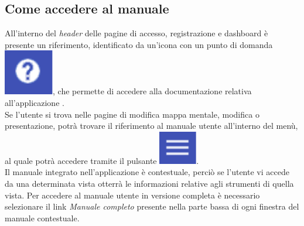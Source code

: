 \subsection{Come accedere al manuale}
All'interno del \textit{header} delle pagine di accesso, registrazione e dashboard è presente un riferimento, identificato da un'icona con un punto di domanda \includegraphics[scale=0.5]{immagini/manualButton.pdf}, che permette di accedere alla documentazione relativa all'applicazione \textbf{\progetto}.\\
Se l'utente si trova nelle pagine di modifica mappa mentale, modifica  o presentazione, potrà trovare il riferimento al manuale utente all'interno del menù, al quale potrà accedere tramite il pulsante \includegraphics[scale=0.5]{immagini/buttonMenu.pdf}.\\
Il manuale integrato nell'applicazione è contestuale, perciò se l'utente vi accede da una determinata vista otterrà le informazioni relative agli strumenti di quella vista. Per accedere al manuale utente in versione completa è necessario selezionare il link \textit{Manuale completo} presente nella parte bassa di ogni finestra del manuale contestuale.
